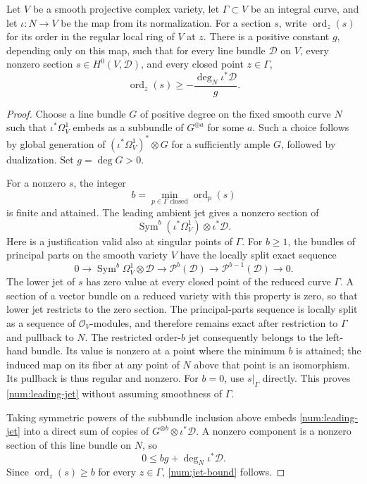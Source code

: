 \begin{lemma}\label{num:jets}
Let \(V\) be a smooth projective complex variety, let
\(\Gamma\subset V\) be an integral curve, and let
\(\iota:N\to V\) be the map from its normalization.
For a section \(s\), write \(\operatorname{ord}_z(s)\) for its order
in the regular local ring of \(V\) at \(z\).
There is a positive constant \(g\), depending only on this map,
such that for every line bundle \(\mathcal D\) on \(V\), every
nonzero section \(s\in H^0(V,\mathcal D)\), and every closed
point \(z\in\Gamma\),
\begin{equation}\label{num:jet-bound}
\operatorname{ord}_z(s)\geq
-\frac{\deg_N\iota^*\mathcal D}{g}.
\end{equation}
\end{lemma}

\begin{proof}
Choose a line bundle \(G\) of positive degree on the fixed smooth
curve \(N\) such that
\(\iota^*\Omega^1_V\) embeds as a subbundle of
\(G^{\oplus a}\) for some \(a\).  Such a choice follows by
global generation of
\((\iota^*\Omega^1_V)^*\otimes G\) for a sufficiently ample
\(G\), followed by dualization.  Set \(g=\deg G>0\).

For a nonzero \(s\), the integer
\[
b=\min_{p\in\Gamma\text{ closed}}\operatorname{ord}_p(s)
\]
is finite and attained.  The leading ambient jet gives a nonzero
section of
\begin{equation}\label{num:leading-jet}
\operatorname{Sym}^b(\iota^*\Omega^1_V)
\otimes\iota^*\mathcal D.
\end{equation}
Here is a justification valid also at singular points of \(\Gamma\).
For \(b\geq1\), the bundles of principal parts on the smooth
variety \(V\) have the locally split exact sequence
\[
0\longrightarrow\operatorname{Sym}^b\Omega^1_V\otimes\mathcal D
\longrightarrow\mathcal P^b(\mathcal D)
\longrightarrow\mathcal P^{b-1}(\mathcal D)
\longrightarrow 0.
\]
The lower jet of \(s\) has zero value at every closed point of
the reduced curve \(\Gamma\). A section of a vector bundle on a
reduced variety with this property is zero, so that lower jet restricts
to the zero section. The principal-parts sequence is locally split
as a sequence of \(\mathcal O_V\)-modules, and therefore remains
exact after restriction to \(\Gamma\) and pullback to \(N\).
The restricted order-\(b\) jet consequently belongs to the left-hand
bundle. Its value is nonzero at a point where the minimum \(b\)
is attained; the induced map on its fiber at any point of \(N\)
above that point is an isomorphism. Its pullback is thus regular and
nonzero.  For \(b=0\), use \(s|_\Gamma\)
directly.  This proves \eqref{num:leading-jet} without assuming
smoothness of \(\Gamma\).

Taking symmetric powers of the subbundle inclusion above embeds
\eqref{num:leading-jet} into a direct sum of copies of
\(G^{\otimes b}\otimes\iota^*\mathcal D\).  A nonzero component
is a nonzero section of this line bundle on \(N\), so
\[
0\leq bg+\deg_N\iota^*\mathcal D.
\]
Since \(\operatorname{ord}_z(s)\geq b\) for every \(z\in\Gamma\),
\eqref{num:jet-bound} follows.
\end{proof}

